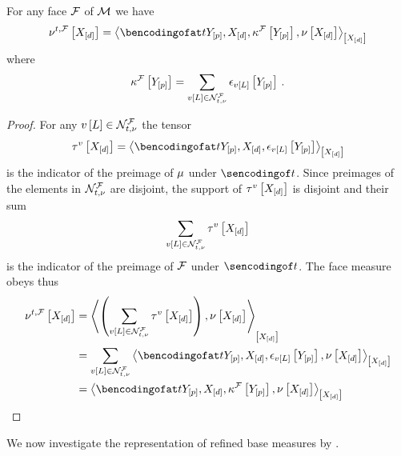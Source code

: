 \begin{theorem}
    \label{the:faceMeasureCharacterization}
    For any face $\mathcal{F}$ of $\mathcal{M}$ we have
    \begin{align*}
        \genfacemeasureat{\shortcatvariables}
        =\contractionof{\sstatccwith,\kcoreofat{\facesymbol}{\headvariables},\basemeasurewith}{\shortcatvariables}
    \end{align*}
    where
    \begin{align*}
        \kappa^{\mathcal{F}}\left[Y_{[p]}\right]
        = \sum_{v\left[L\right]\in\mathcal{N}_{t,\nu}^{\mathcal{F}}} \epsilon_{v\left[L\right]}\left[Y_{[p]}\right] \, .
    \end{align*}
\end{theorem}
\begin{proof}
    For any $v\left[L\right]\in\mathcal{N}_{t,\nu}^{\mathcal{F}}$ the tensor
    \begin{align*}
        \hypercoreofat{\imelement}{\shortcatvariables}
        = \contractionof{\sstatccwith,\onehotmapofat{\imelementwith}{\headvariables}}{\shortcatvariables}
    \end{align*}
    is the indicator of the preimage of $\mu$ under $\sstatencoding$.
    Since preimages of the elements in $\mathcal{N}_{t,\nu}^{\mathcal{F}}$ are disjoint, the support of $\tau^{v}\left[X_{[d]}\right]$ is disjoint and their sum
    \begin{align*}
        \sum_{v\left[L\right]\in\mathcal{N}_{t,\nu}^{\mathcal{F}}} \tau^{v}\left[X_{[d]}\right]
    \end{align*}
    is the indicator of the preimage of $\mathcal{F}$ under $\sstatencoding$.
    The face measure obeys thus
    \begin{align*}
        \genfacemeasurewith
        &= \contractionof{\left(
                              \sum_{\imelementwith\in\genfaceimset} \hypercoreofat{\imelement}{\shortcatvariables}
        \right), \basemeasurewith}{\shortcatvariables} \\
        &= \sum_{\imelementwith\in\genfaceimset}
        \contractionof{\sstatccwith,\onehotmapofat{\imelementwith}{\headvariables},\basemeasurewith}{\shortcatvariables} \\
        & = \contractionof{\sstatccwith,\kcoreofat{\facesymbol}{\headvariables},\basemeasurewith}{\shortcatvariables} \qedhere
    \end{align*}
\end{proof}

We now investigate the representation of refined base measures by \ComputationActivationNetworks{}.

